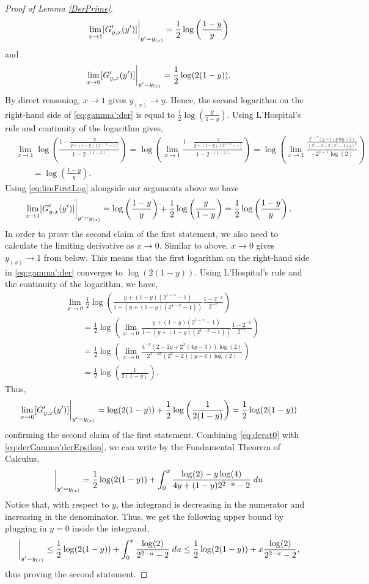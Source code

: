 \documentclass[12pt,reqno]{amsart}
\numberwithin{equation}{section}
\theoremstyle{definition}
\newcommand{\conv}[1]{\overset{#1}{\rightarrow}}
\newcommand{\gl}{y + (1-y)(2^{1-x} - 1)}
\renewcommand{\[}{\begin{equation}}
\renewcommand{\]}{\end{equation}}
\renewcommand{\|}{\bigg{|}}
\begin{document}
\begin{proof}[Proof of Lemma \ref{DerPrime}]
    \[\lim_{x\conv{} 1}[G'_{y,x}(y')]\bigg{|}_{y' = y_{(x)}} = \frac{1}{2}\log\left(\frac{1-y}{y}\right)\]
    and 
    \[\lim_{x\conv{} 0}[G'_{y,x}(y')]\bigg{|}_{y' = y_{(x)}} = \frac{1}{2}\log(2(1-y)).\]
    By direct reasoning, $x \conv{} 1$ gives $y_{(x)} \conv{} y$. Hence, the second logarithm on the right-hand side of \eqref{eq:gamma':der} is equal to $\frac{1}{2}\log\left( \frac{y}{1-y}\right)$. Using L'Hospital's rule and continuity of the logarithm gives,
    \begin{align}
        &\lim_{x \conv{} 1}\log\left(\frac{1- \frac{y}{y + (1-y)(2^{1-x}-1)}}{1-2^{-(1-x)}} \right) =\log\left(\lim_{x \conv{} 1}\frac{1- \frac{y}{y + (1-y)(2^{1-x}-1)}}{1-2^{-(1-x)}} \right) =\log\left(\lim_{x \conv{} 1} \frac{\frac{2^{1+x}(y - 1)y \log(2)}{(2^x - 2 - 2(2^x -1)y)^2}}{-2^{x - 1}\log(2)} \right)\\
        &\qquad=\log\left(\frac{1-y}{y} \right).\label{eq:limFirstLog}
    \end{align}
    Using \eqref{eq:limFirstLog} alongside our arguments above we have
    \[
        \lim_{x\conv{} 1}[G'_{y,x}(y')]\bigg{|}_{y' = y_{(x)}} = \log\left(\frac{1-y}{y}\right) + \frac{1}{2}\log\left( \frac{y}{1-y}\right) = \frac{1}{2}\log\left(\frac{1-y}{y}\right).
    \]
    In order to prove the second claim of the first statement, we also need to calculate the limiting derivative as $x \conv{} 0$. Similar to above, $x \conv{} 0$ gives $y_{(x)} \conv{} 1$ from below. This means that the first logarithm on the right-hand side in \eqref{eq:gamma':der} converges to $\log(2(1-y))$. Using L'Hospital's rule and the continuity of the logarithm, we have,
    \begin{align}
        &\lim_{x \conv{} 0}\frac{1}{2}\log\left(\frac{\gl}{1-(\gl)}\frac{1-2^{-x}}{2^{-x}}\right)\\ 
        &\qquad= \frac{1}{2}\log\left(\lim_{x \conv{} 0}\frac{\gl}{1-(\gl)}\frac{1-2^{-x}}{2^{-x}}\right)\\
        &\qquad= \frac{1}{2}\log\left(\lim_{x \conv{} 0}\frac{4^{-x}(2-2y + 2^x(4y - 3))\log(2)}{2^{1-2x}(2^x - 2)(y - 1)\log(2)}\right)\\
        &\qquad=\frac{1}{2}\log\left(\frac{1}{2(1-y)}\right).\label{eq:2ndLogLimit}
    \end{align}
    Thus,
    \[
    \lim_{x\conv{} 0}[G'_{y,x}(y')]\bigg{|}_{y' = y_{(x)}}= \log(2(1-y)) + \frac{1}{2}\log\left(\frac{1}{2(1-y)} \right) = \frac{1}{2}\log(2(1-y))
        \label{eq:derat0}\]
    confirming the second claim of the first statement.
    Combining \eqref{eq:derat0} with \eqref{eq:derGamma'derEpsilon}, we can write by the Fundamental Theorem of Calculus,
    \[[G'_{y,x}(y')]\bigg{|}_{y' = y_{(x)}} = \frac{1}{2}\log(2(1-y)) + \int_0^x \frac{\log(2) - y \log(4)}{4y + (1-y)2^{2-u} -2} \;du\]
    Notice that, with respect to $y$, the integrand is decreasing in the numerator and increasing in the denominator. Thus, we get the following upper bound by plugging in $y = 0$ inside the integrand,
    \[[G'_{y,x}(y')]\bigg{|}_{y' = y_{(x)}} \leq \frac{1}{2}\log(2(1-y)) + \int_0^x \frac{\log(2)}{2^{2-u} -2} \;du \leq \frac{1}{2}\log(2(1-y)) + x \frac{\log(2)}{2^{2-x} -2},\]
    thus proving the second statement.
\end{proof}
\end{document}
